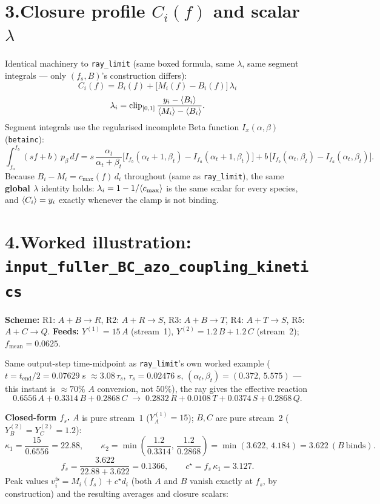 \documentclass[11pt]{article}
\newcommand{\fs}{f_s}
\newcommand{\code}[1]{\texttt{\small #1}}
\DeclarePairedDelimiter{\avg}{\langle}{\rangle}
\begin{document}
\section*{3.\quad Closure profile \(C_i(f)\) and scalar \(\lambda\)}

Identical machinery to \texttt{ray\_limit} (same boxed formula, same \(\lambda\), same
segment integrals --- only \((\fs,B)\)'s construction differs):
\[
\boxed{\;C_i(f)=B_i(f)+\bigl[M_i(f)-B_i(f)\bigr]\,\lambda_i\;}
\]
\[
\lambda_i=\operatorname{clip}_{[0,1]}\frac{y_i-\avg{B_i}}{\avg{M_i}-\avg{B_i}}.
\]
Segment integrals use the regularised incomplete Beta function \(I_x(\alpha,\beta)\)
(\code{betainc}):
\[
\int_{f_a}^{f_b}(sf+b)\,p_\beta\,df
= s\,\frac{\alpha_t}{\alpha_t+\beta_t}
  \bigl[I_{f_b}(\alpha_t{+}1,\beta_t)-I_{f_a}(\alpha_t{+}1,\beta_t)\bigr]
+ b\,\bigl[I_{f_b}(\alpha_t,\beta_t)-I_{f_a}(\alpha_t,\beta_t)\bigr].
\]
Because \(B_i-M_i=c_{\max}(f)\,d_i\) throughout (same as \texttt{ray\_limit}), the same
\textbf{global \(\lambda\)} identity holds: \(\lambda_i=1-1/\avg{c_{\max}}\) is the same
scalar for every species, and \(\avg{C_i}=y_i\) exactly whenever the clamp is not
binding.

\section*{4.\quad Worked illustration: \texttt{input\_fuller\_BC\_azo\_coupling\_kinetics}}

\textbf{Scheme:} R1: \(A{+}B\!\to\!R\), R2: \(A{+}R\!\to\!S\), R3: \(A{+}B\!\to\!T\),
R4: \(A{+}T\!\to\!S\), R5: \(A{+}C\!\to\!Q\).
\textbf{Feeds:} \(Y^{(1)}=15\,A\) (stream~1), \(Y^{(2)}=1.2\,B+1.2\,C\) (stream~2);
\(f_{\mathrm{mean}}=0.0625\).

Same output-step time-midpoint as \texttt{ray\_limit}'s own worked example
(\(t=t_{\mathrm{end}}/2=0.07629\) s \(\approx 3.08\,\tau_s\), \(\tau_s=0.02476\) s,
\((\alpha_t,\beta_t)=(0.372,\,5.575)\) --- this instant is \(\approx 70\%\) \(A\)
conversion, not \(50\%\)), the ray gives the effective reaction
\[
0.6556\,A + 0.3314\,B + 0.2868\,C \;\longrightarrow\;
0.2832\,R + 0.0108\,T + 0.0374\,S + 0.2868\,Q.
\]

\textbf{Closed-form \(\fs\).} \(A\) is pure stream~1 (\(Y^{(1)}_A=15\)); \(B,C\) are
pure stream~2 (\(Y^{(2)}_B=Y^{(2)}_C=1.2\)):
\[
\kappa_1=\frac{15}{0.6556}=22.88,\qquad
\kappa_2=\min\!\left(\frac{1.2}{0.3314},\,\frac{1.2}{0.2868}\right)
=\min(3.622,\,4.184)=3.622\ (B\ \text{binds}).
\]
\[
\fs=\frac{3.622}{22.88+3.622}=0.1366,\qquad c^{\star}=\fs\,\kappa_1=3.127.
\]
Peak values \(v^{\mathrm{fs}}_i=M_i(\fs)+c^{\star}d_i\) (both \(A\) and \(B\) vanish
exactly at \(\fs\), by construction) and the resulting averages and closure scalars:
\end{document}
